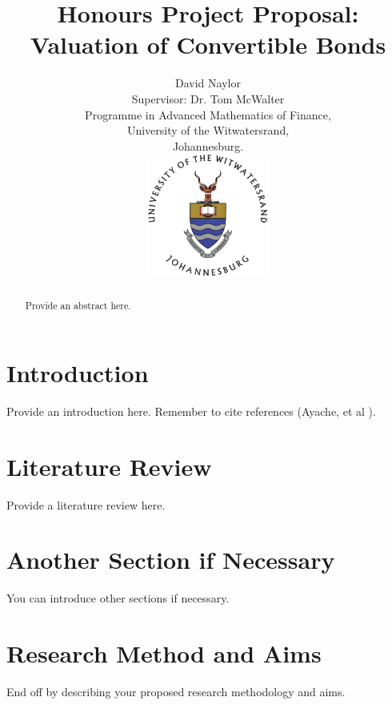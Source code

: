 \documentclass[a4paper,11pt,oneside]{article}
\title{Honours Project Proposal:\\
Valuation of Convertible Bonds}
\author{David Naylor\\[1cm]
Supervisor: Dr. Tom McWalter\\[3cm]
Programme in Advanced Mathematics of Finance,\\
University of the Witwatersrand,\\
Johannesburg.\\[2cm]
\includegraphics[width=4cm]{../common/WitsColourLogo}\\[2cm]
}
\newcommand{\setlinespacing}[1]
           {\renewcommand{\baselinestretch}{#1}\small\normalsize}
\begin{document}
\maketitle
\thispagestyle{empty}

\setlinespacing{1.20}
\newpage

\setcounter{page}{1}


\def\abstractname{\Large Abstract}
\begin{abstract}
Provide an abstract here.
\end{abstract}



\section{Introduction}

Provide an introduction here. Remember to cite references (Ayache, et al \cite{AFV03}).

\section{Literature Review}

Provide a literature review here.

\section{Another Section if Necessary}

You can introduce other sections if necessary.

\section{Research Method and Aims}

End off by describing your proposed research methodology and aims.


\clearpage
\setlinespacing{1}


\end{document}
